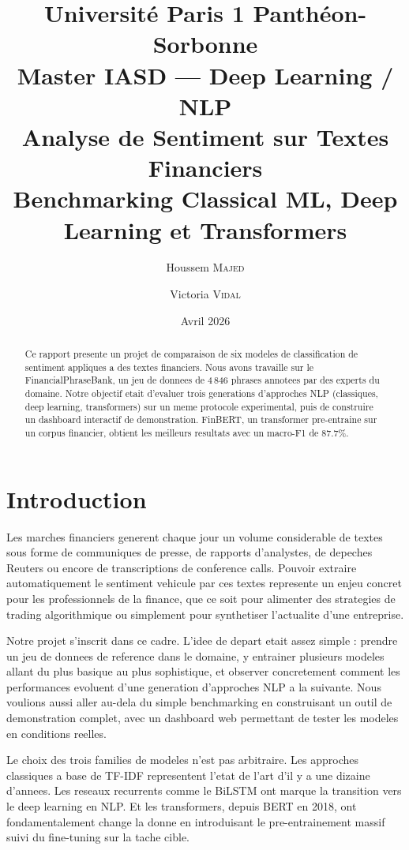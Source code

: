 \documentclass[12pt, a4paper]{article}
\title{
  \vspace{-1cm}
  {\large Universit\'e Paris 1 Panth\'eon-Sorbonne}\\
  {\large Master IASD --- Deep Learning / NLP}\\[1cm]
  {\LARGE\bfseries\color{paris1blue} Analyse de Sentiment sur Textes Financiers}\\[0.3cm]
  {\large Benchmarking Classical ML, Deep Learning et Transformers}
}
\author{
  Houssem \textsc{Majed} \and Victoria \textsc{Vidal}
}
\date{Avril 2026}
\begin{document}
\maketitle
\thispagestyle{empty}

\begin{abstract}
Ce rapport presente un projet de comparaison de six modeles de classification
de sentiment appliques a des textes financiers. Nous avons travaille sur le
FinancialPhraseBank, un jeu de donnees de 4\,846 phrases annotees par des experts
du domaine. Notre objectif etait d'evaluer trois generations d'approches NLP
(classiques, deep learning, transformers) sur un meme protocole experimental,
puis de construire un dashboard interactif de demonstration. FinBERT, un
transformer pre-entraine sur un corpus financier, obtient les meilleurs resultats
avec un macro-F1 de 87.7\%.
\end{abstract}

\newpage
\tableofcontents
\newpage

\section{Introduction}

Les marches financiers generent chaque jour un volume considerable de textes sous
forme de communiques de presse, de rapports d'analystes, de depeches Reuters ou
encore de transcriptions de conference calls. Pouvoir extraire automatiquement le
sentiment vehicule par ces textes represente un enjeu concret pour les professionnels
de la finance, que ce soit pour alimenter des strategies de trading algorithmique ou
simplement pour synthetiser l'actualite d'une entreprise.

Notre projet s'inscrit dans ce cadre. L'idee de depart etait assez simple : prendre
un jeu de donnees de reference dans le domaine, y entrainer plusieurs modeles allant
du plus basique au plus sophistique, et observer concretement comment les performances
evoluent d'une generation d'approches NLP a la suivante. Nous voulions aussi aller
au-dela du simple benchmarking en construisant un outil de demonstration complet, avec
un dashboard web permettant de tester les modeles en conditions reelles.

Le choix des trois families de modeles n'est pas arbitraire. Les approches classiques
a base de TF-IDF representent l'etat de l'art d'il y a une dizaine d'annees. Les
reseaux recurrents comme le BiLSTM ont marque la transition vers le deep learning
en NLP. Et les transformers, depuis BERT en 2018, ont fondamentalement change la
donne en introduisant le pre-entrainement massif suivi du fine-tuning sur la tache
cible.
\end{document}
